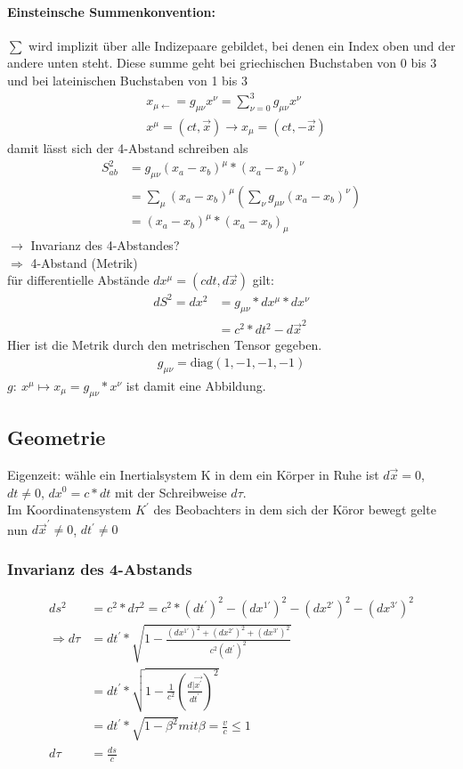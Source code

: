 \documentclass[a4paper]{article}
\begin{document}
\paragraph{Einsteinsche Summenkonvention:} 
$\sum$ wird implizit über alle Indizepaare gebildet, bei denen ein Index oben
und der andere unten steht. Diese summe geht bei griechischen Buchstaben von 0
bis 3 und bei lateinischen Buchstaben von 1 bis 3
\begin{align}
&x_{\mu \leftarrow}=g_{\mu \nu}x^{\nu}=\sum_{\nu=0}^3g_{\mu \nu}x^{\nu}\\
&x^{\mu}=(ct,\vec{x}) \rightarrow x_{\mu}=(ct,-\vec{x})
\end{align}
damit lässt sich der 4-Abstand schreiben als
\begin{align}
S^2_{ab}&=g_{\mu \nu}(x_a-x_b)^{\mu}*(x_a-x_b)^{\nu}\\
&=\sum_{\mu}(x_a-x_b)^{\mu}\left(\sum_{\nu}g_{\mu \nu}(x_a-x_b)^{\nu}\right)\\
&=(x_a-x_b)^{\mu}*(x_a-x_b)_{\mu}
\end{align}
$\rightarrow$ Invarianz des 4-Abstandes?\\
$\Rightarrow$ 4-Abstand (Metrik)\\
für differentielle Abstände $dx^{\mu}=(cdt,d\vec{x})$ gilt:
\begin{align}
dS^2=dx^2&=g_{\mu \nu}*dx^{\mu}*dx^{\nu}\\
&=c^2*dt^2-d\vec{x}^2
\end{align}
Hier ist die Metrik durch den metrischen Tensor gegeben.
\begin{align}
g_{\mu \nu}=\text{diag}(1,-1,-1,-1)
\end{align}
$g:\ x^{\mu} \mapsto x_{\mu}=g_{\mu
\nu}*x^{\nu}$ ist damit eine Abbildung.\\

\subsection{Geometrie}
Eigenzeit: wähle ein Inertialsystem K in dem ein Körper in Ruhe ist
$d\vec{x}=0$, $dt\neq0$, $dx^0=c*dt$ mit der Schreibweise $d\tau$.\\
Im Koordinatensystem $K^{'}$ des Beobachters in dem sich der Köror bewegt gelte
nun $d\vec{x}^{'}\neq0$, $dt^{'}\neq0$\\
\subsubsection{Invarianz des 4-Abstands} 
\begin{align}
ds^2&=c^2*d\tau^2=c^2*(dt^{'})^2-(dx^{1'})^2-(dx^{2'})^2-(dx^{3'})^2\\
\Rightarrow
d\tau&=dt^{'}*\sqrt{1-\frac{(dx^{1'})^2+(dx^{2'})^2+(dx^{3'})^2}{c^2
(dt^{'})^2}}\\
&=dt^{'}*\sqrt{1-\frac{1}{c^2}\left(\frac{d|\vec{x^{'}}}{dt^{'}}\right)^2}\\
&=dt^{'}*\sqrt{1-\beta^2} mit \beta=\frac{v}{c}\leq1 \\
d\tau&=\frac{ds}{c}
\end{align}
\end{document}
